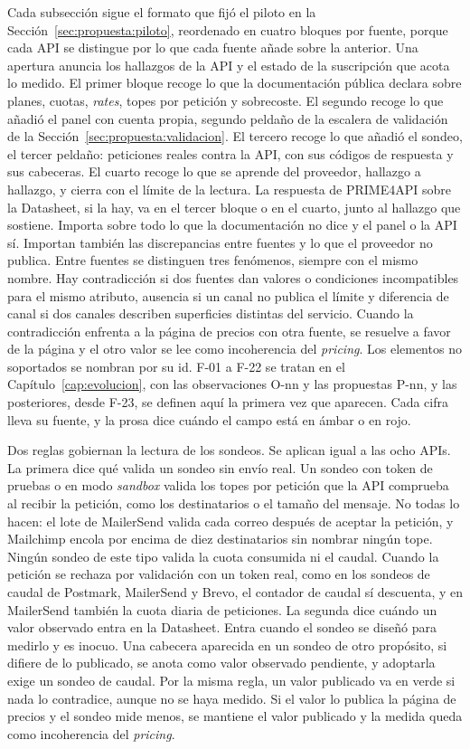 Cada subsección sigue el formato que fijó el piloto en la
Sección~\ref{sec:propuesta:piloto}, reordenado en cuatro bloques por
fuente, porque cada API se distingue por lo que cada fuente añade sobre la
anterior. Una apertura anuncia los hallazgos de la API y el estado de la
suscripción que acota lo medido. El primer bloque recoge lo que la documentación
pública declara sobre planes, cuotas, \textit{rates}, topes por petición y
sobrecoste. El segundo recoge lo que añadió el panel con cuenta propia,
segundo peldaño de la escalera de validación de la
Sección~\ref{sec:propuesta:validacion}. El tercero recoge lo que añadió el
sondeo, el tercer peldaño: peticiones reales contra la API, con sus códigos
de respuesta y sus cabeceras. El cuarto recoge lo que se aprende del proveedor,
hallazgo a hallazgo, y cierra con el límite de la lectura. La respuesta de
PRIME4API sobre la Datasheet, si la hay, va en el tercer bloque o en el
cuarto, junto al hallazgo que sostiene. Importa sobre
todo lo que la documentación no dice y el panel o la API sí. Importan
también las discrepancias entre fuentes y lo que el proveedor no publica.
Entre fuentes se distinguen tres fenómenos, siempre con el mismo nombre.
Hay contradicción si dos fuentes dan valores o condiciones incompatibles
para el mismo atributo, ausencia si un canal no publica el límite y
diferencia de canal si dos canales describen superficies distintas del
servicio.
Cuando la contradicción enfrenta a la página de precios con otra fuente, se resuelve a favor de la página y el otro valor se lee como incoherencia del \textit{pricing}.
Los elementos no soportados se nombran por su id. F-01 a F-22
se tratan en el Capítulo~\ref{cap:evolucion}, con las observaciones O-nn y
las propuestas P-nn, y las posteriores, desde F-23, se definen aquí la
primera vez que aparecen. Cada cifra lleva su fuente, y la prosa dice
cuándo el campo está en ámbar o en rojo.

Dos reglas gobiernan la lectura de los sondeos. Se aplican igual a las
ocho APIs. La primera dice qué valida un sondeo sin envío real. Un
sondeo con token de pruebas o en modo \textit{sandbox} valida los topes
por petición que la API comprueba al recibir la petición, como los
destinatarios o el tamaño del mensaje. No todas lo hacen: el lote de
MailerSend valida cada correo después de aceptar la petición, y Mailchimp
encola por encima de diez destinatarios sin nombrar ningún tope.
Ningún sondeo de este tipo valida la cuota consumida ni el caudal. Cuando la petición se rechaza por validación
con un token real, como en los sondeos de caudal de Postmark, MailerSend y
Brevo, el contador de caudal sí descuenta, y en MailerSend también la
cuota diaria de peticiones. La segunda dice cuándo un valor observado entra
en la Datasheet. Entra cuando el sondeo se diseñó para medirlo y es
inocuo. Una cabecera aparecida en un sondeo de otro propósito, si
difiere de lo publicado, se anota como valor observado pendiente, y
adoptarla exige un sondeo de caudal. Por la misma regla, un valor publicado va en verde si nada lo
contradice, aunque no se haya medido.
Si el valor lo publica la página de precios y el sondeo mide menos, se mantiene el valor publicado y la medida queda como incoherencia del \textit{pricing}.

